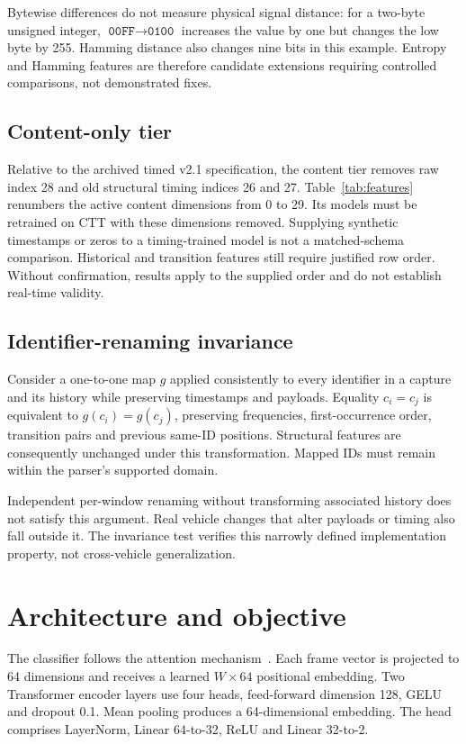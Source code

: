 \documentclass[12pt,a4paper,oneside,openany]{extbook}
\begin{document}
Bytewise differences do not measure physical signal distance: for a two-byte unsigned integer, $\texttt{00FF}\rightarrow\texttt{0100}$ increases the value by one but changes the low byte by 255. Hamming distance also changes nine bits in this example. Entropy and Hamming features are therefore candidate extensions requiring controlled comparisons, not demonstrated fixes.

\subsection{Content-only tier}
Relative to the archived timed v2.1 specification, the content tier removes raw index 28 and old structural timing indices 26 and 27. Table~\ref{tab:features} renumbers the active content dimensions from 0 to 29. Its models must be retrained on CTT with these dimensions removed. Supplying synthetic timestamps or zeros to a timing-trained model is not a matched-schema comparison. Historical and transition features still require justified row order. Without confirmation, results apply to the supplied order and do not establish real-time validity.

\subsection{Identifier-renaming invariance}
Consider a one-to-one map $g$ applied consistently to every identifier in a capture and its history while preserving timestamps and payloads. Equality $c_i=c_j$ is equivalent to $g(c_i)=g(c_j)$, preserving frequencies, first-occurrence order, transition pairs and previous same-ID positions. Structural features are consequently unchanged under this transformation. Mapped IDs must remain within the parser's supported domain.

Independent per-window renaming without transforming associated history does not satisfy this argument. Real vehicle changes that alter payloads or timing also fall outside it. The invariance test verifies this narrowly defined implementation property, not cross-vehicle generalization.

\section{Architecture and objective}
The classifier follows the attention mechanism~\cite{vaswani2017attention}. Each frame vector is projected to 64 dimensions and receives a learned $W\times64$ positional embedding. Two Transformer encoder layers use four heads, feed-forward dimension 128, GELU and dropout 0.1. Mean pooling produces a 64-dimensional embedding. The head comprises LayerNorm, Linear 64-to-32, ReLU and Linear 32-to-2.
\end{document}
